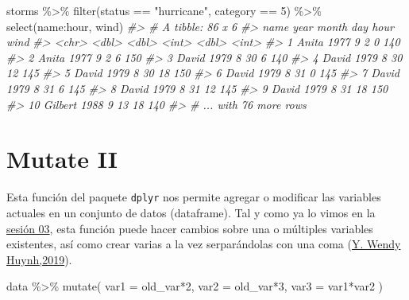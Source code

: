 \documentclass[
]{book}
\newenvironment{Shaded}{\begin{snugshade}}{\end{snugshade}}
\newcommand{\AttributeTok}[1]{\textcolor[rgb]{0.77,0.63,0.00}{#1}}
\newcommand{\CommentTok}[1]{\textcolor[rgb]{0.56,0.35,0.01}{\textit{#1}}}
\newcommand{\DecValTok}[1]{\textcolor[rgb]{0.00,0.00,0.81}{#1}}
\newcommand{\FunctionTok}[1]{\textcolor[rgb]{0.00,0.00,0.00}{#1}}
\newcommand{\NormalTok}[1]{#1}
\newcommand{\SpecialCharTok}[1]{\textcolor[rgb]{0.00,0.00,0.00}{#1}}
\newcommand{\StringTok}[1]{\textcolor[rgb]{0.31,0.60,0.02}{#1}}
\begin{document}
\begin{Shaded}
\begin{Highlighting}[]
\NormalTok{storms }\SpecialCharTok{\%\textgreater{}\%} 
  \FunctionTok{filter}\NormalTok{(status }\SpecialCharTok{==} \StringTok{"hurricane"}\NormalTok{,}
\NormalTok{         category }\SpecialCharTok{==} \DecValTok{5}\NormalTok{) }\SpecialCharTok{\%\textgreater{}\%} 
  \FunctionTok{select}\NormalTok{(name}\SpecialCharTok{:}\NormalTok{hour, wind)}
\CommentTok{\#\textgreater{} \# A tibble: 86 x 6}
\CommentTok{\#\textgreater{}    name     year month   day  hour  wind}
\CommentTok{\#\textgreater{}    \textless{}chr\textgreater{}   \textless{}dbl\textgreater{} \textless{}dbl\textgreater{} \textless{}int\textgreater{} \textless{}dbl\textgreater{} \textless{}int\textgreater{}}
\CommentTok{\#\textgreater{}  1 Anita    1977     9     2     0   140}
\CommentTok{\#\textgreater{}  2 Anita    1977     9     2     6   150}
\CommentTok{\#\textgreater{}  3 David    1979     8    30     6   140}
\CommentTok{\#\textgreater{}  4 David    1979     8    30    12   145}
\CommentTok{\#\textgreater{}  5 David    1979     8    30    18   150}
\CommentTok{\#\textgreater{}  6 David    1979     8    31     0   145}
\CommentTok{\#\textgreater{}  7 David    1979     8    31     6   145}
\CommentTok{\#\textgreater{}  8 David    1979     8    31    12   145}
\CommentTok{\#\textgreater{}  9 David    1979     8    31    18   150}
\CommentTok{\#\textgreater{} 10 Gilbert  1988     9    13    18   140}
\CommentTok{\#\textgreater{} \# ... with 76 more rows}
\end{Highlighting}
\end{Shaded}

\hypertarget{mutate-ii-1}{%
\section{Mutate II}\label{mutate-ii-1}}

Esta función del paquete \texttt{dplyr} nos permite agregar o modificar las variables actuales en un conjunto de datos (dataframe). Tal y como ya lo vimos en la \href{https://healthinnovation.github.io/curso-introduccion-r-tidyverse/sesion_03/\#6}{sesión 03}, esta función puede hacer cambios sobre una o múltiples variables existentes, así como crear varias a la vez serparándolas con una coma (\href{https://bookdown.org/yih_huynh/Guide-to-R-Book/mutate.html}{Y. Wendy Huynh,2019}).

\begin{Shaded}
\begin{Highlighting}[]
\NormalTok{data }\SpecialCharTok{\%\textgreater{}\%} 
  \FunctionTok{mutate}\NormalTok{(}
    \AttributeTok{var1 =}\NormalTok{ old\_var}\SpecialCharTok{*}\DecValTok{2}\NormalTok{,}
    \AttributeTok{var2 =}\NormalTok{ old\_var}\SpecialCharTok{*}\DecValTok{3}\NormalTok{,}
    \AttributeTok{var3 =}\NormalTok{ var1}\SpecialCharTok{*}\NormalTok{var2}
\NormalTok{  )}
\end{Highlighting}
\end{Shaded}
\end{document}
